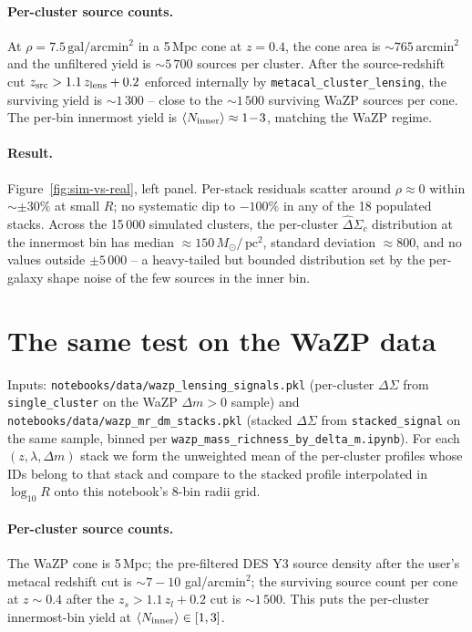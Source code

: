 \documentclass[11pt,a4paper]{article}
\newcommand{\DS}{\Delta\Sigma}
\newcommand{\Msun}{M_{\odot}}
\newcommand{\pc}{\,\mathrm{pc}}
\begin{document}
\paragraph{Per-cluster source counts.}
At $\rho = 7.5\,\mathrm{gal}/\mathrm{arcmin}^{2}$ in a 5\,Mpc cone at
$z = 0.4$, the cone area is $\sim 765\,\mathrm{arcmin}^{2}$ and the
unfiltered yield is $\sim 5\,700$ sources per cluster.  After the
source-redshift cut $z_{\rm src} > 1.1\,z_{\rm lens} + 0.2$ enforced
internally by \verb|metacal_cluster_lensing|, the surviving yield is
$\sim 1\,300$ -- close to the $\sim 1\,500$ surviving WaZP sources per
cone.  The per-bin innermost yield is
$\langle N_{\rm inner}\rangle \approx 1\!-\!3$, matching the WaZP
regime.

\paragraph{Result.}
Figure~\ref{fig:sim-vs-real}, left panel.  Per-stack residuals scatter
around $\rho \approx 0$ within $\sim\pm 30\%$ at small $R$; no
systematic dip to $-100\%$ in any of the 18 populated stacks.  Across
the 15\,000 simulated clusters, the per-cluster $\widehat\DS_c$
distribution at the innermost bin has median
$\approx 150\,\Msun/\pc^{2}$, standard deviation $\approx 800$, and no
values outside $\pm 5\,000$ -- a heavy-tailed but bounded distribution
set by the per-galaxy shape noise of the few sources in the inner bin.


\section{The same test on the WaZP data}
\label{sec:data}

Inputs: \verb|notebooks/data/wazp_lensing_signals.pkl| (per-cluster
$\DS$ from \verb|single_cluster| on the WaZP $\Delta m > 0$ sample) and
\verb|notebooks/data/wazp_mr_dm_stacks.pkl| (stacked $\DS$ from
\verb|stacked_signal| on the same sample, binned per
\verb|wazp_mass_richness_by_delta_m.ipynb|).  For each $(z, \lambda,
\Delta m)$ stack we form the unweighted mean of the per-cluster
profiles whose IDs belong to that stack and compare to the stacked
profile interpolated in $\log_{10} R$ onto this notebook's 8-bin radii
grid.

\paragraph{Per-cluster source counts.}
The WaZP cone is 5\,Mpc; the pre-filtered DES Y3 source density after
the user's metacal redshift cut is $\sim 7\!-\!10$ gal/arcmin$^{2}$;
the surviving source count per cone at $z \sim 0.4$ after the
$z_s > 1.1\,z_l + 0.2$ cut is $\sim 1\,500$.  This puts the per-cluster
innermost-bin yield at $\langle N_{\rm inner}\rangle \in [1, 3]$.
\end{document}
